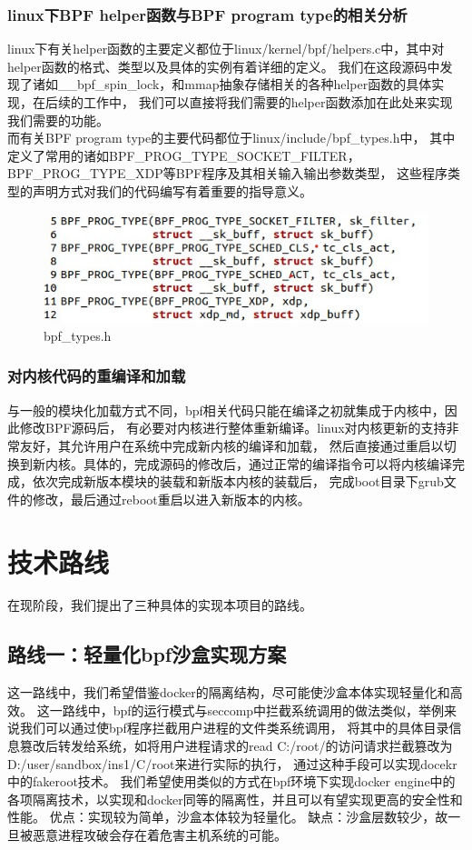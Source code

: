\documentclass[AutoFakeBold,a4paper]{ctexart}
\begin{document}
\subsubsection{linux下BPF helper函数与BPF program type的相关分析}
linux下有关helper函数的主要定义都位于linux/kernel/bpf/helpers.c中，其中对helper函数的格式、类型以及具体的实例有着详细的定义。
我们在这段源码中发现了诸如__bpf_spin_lock，和mmap抽象存储相关的各种helper函数的具体实现，在后续的工作中，
我们可以直接将我们需要的helper函数添加在此处来实现我们需要的功能。\\ 
而有关BPF program type的主要代码都位于linux/include/bpf_types.h中，
其中定义了常用的诸如BPF_PROG_TYPE_SOCKET_FILTER，BPF_PROG_TYPE_XDP等BPF程序及其相关输入输出参数类型，
这些程序类型的声明方式对我们的代码编写有着重要的指导意义。
\begin{figure}[H]
    \centering
    \includegraphics[width=0.7\columnwidth]{../LvHongtao/pic_3.jpg}
    \caption{bpf_types.h}
\end{figure}

\subsubsection{对内核代码的重编译和加载}
与一般的模块化加载方式不同，bpf相关代码只能在编译之初就集成于内核中，因此修改BPF源码后，
有必要对内核进行整体重新编译。linux对内核更新的支持非常友好，其允许用户在系统中完成新内核的编译和加载，
然后直接通过重启以切换到新内核。具体的，完成源码的修改后，通过正常的编译指令可以将内核编译完成，依次完成新版本模块的装载和新版本内核的装载后，
完成boot目录下grub文件的修改，最后通过reboot重启以进入新版本的内核。




\section{技术路线}
在现阶段，我们提出了三种具体的实现本项目的路线。
\subsection{路线一：轻量化bpf沙盒实现方案}
这一路线中，我们希望借鉴docker的隔离结构，尽可能使沙盒本体实现轻量化和高效。
这一路线中，bpf的运行模式与seccomp中拦截系统调用的做法类似，举例来说我们可以通过使bpf程序拦截用户进程的文件类系统调用，
将其中的具体目录信息篡改后转发给系统，如将用户进程请求的read C:/root/的访问请求拦截篡改为D:/user/sandbox/ins1/C/root来进行实际的执行，
通过这种手段可以实现docekr中的fakeroot技术。
我们希望使用类似的方式在bpf环境下实现docker engine中的各项隔离技术，以实现和docker同等的隔离性，并且可以有望实现更高的安全性和性能。
优点：实现较为简单，沙盒本体较为轻量化。
缺点：沙盒层数较少，故一旦被恶意进程攻破会存在着危害主机系统的可能。
\end{document}
